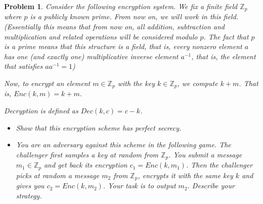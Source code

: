 \documentclass{../homework}
\newtheorem{problem}{Problem}
\begin{document}
\begin{problem}
    Consider the following encryption system. We fix a finite field
    $\mathbb{Z}_p$ where $p$ is a publicly known prime. From now on, we will
    work in this field. (Essentially this means that from now on, all addition,
    subtraction and multiplication and related operations will be considered
    modulo $p$. The fact that $p$ is a prime means that this structure is a
    field, that is, every nonzero element $a$ has one (and exactly one)
    multiplicative inverse element $a^{-1}$, that is, the element that satisfies
    $aa^{-1}=1$)
    
    Now, to encrypt an element $m\in \mathbb{Z}_p$ with the key $k\in
    \mathbb{Z}_p$, we compute $k+m$. That is, $Enc(k,m)=k+m$.
    
    Decryption is defined as $Dec(k,c)=c-k$.

\begin{itemize}
    \item Show that this encryption scheme has perfect secrecy.
    \item You are an adversary against this scheme in the following game. The
    challenger first samples a key at random from $\mathbb{Z}_p$. You submit a
    message $m_1\in \mathbb{Z}_p$ and get back its encryption $c_1=Enc(k,m_1)$.
    Then the challenger picks at random a message $m_2$  from $\mathbb{Z}_p$,
    encrypts it with the same key $k$ and gives you $c_2=Enc(k,m_2)$. Your task
    is to output $m_2$. Describe your strategy.
\end{itemize}
\end{problem}
\end{document}
